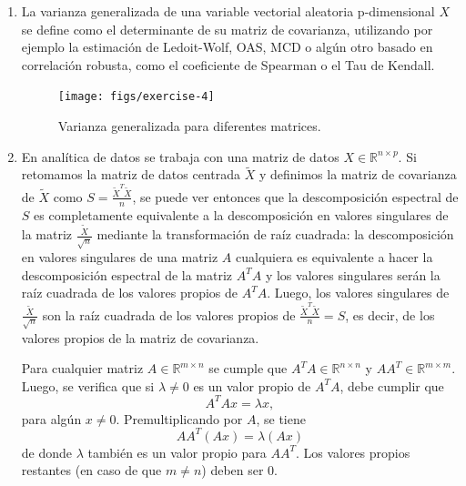 \documentclass[fleqn]{article}
\begin{document}
\begin{enumerate}
  \item La varianza generalizada de una variable vectorial aleatoria
    p-dimensional $X$ se define como el determinante de su matriz de covarianza,
    utilizando por ejemplo la estimación de Ledoit-Wolf, OAS, MCD o algún otro
    basado en correlación robusta, como el coeficiente de Spearman o el Tau de
    Kendall.
    \begin{figure}[H]
      \centering
      \texttt{[image: figs/exercise-4]}
      \caption{Varianza generalizada para diferentes matrices.}
    \end{figure}

  \item En analítica de datos se trabaja con una matriz de datos
    $X\in\mathbb{R}^{n\times p}$. Si retomamos la matriz de datos centrada
    $\tilde{X}$ y definimos la matriz de covarianza de $\tilde{X}$ como
    $S=\frac{\tilde{X}^T\tilde{X}}{n}$, se puede ver entonces que la
    descomposición espectral de $S$ es completamente equivalente a la
    descomposición en valores singulares de la matriz
    $\frac{\tilde{X}}{\sqrt{n}}$ mediante la transformación de raíz cuadrada: la
    descomposición en valores singulares de una matriz $A$ cualquiera es
    equivalente a hacer la descomposición espectral de la matriz $A^TA$ y los
    valores singulares serán la raíz cuadrada de los valores propios de $A^TA$.
    Luego, los valores singulares de $\frac{\tilde{X}}{\sqrt{n}}$ son la raíz
    cuadrada de los valores propios de $\frac{\tilde{X}^T\tilde{X}}{n}=S$, es
    decir, de los valores propios de la matriz de covarianza.

    Para cualquier matriz $A\in\mathbb{R}^{m\times n}$ se cumple que
    $A^TA\in\mathbb{R}^{n\times n}$ y $AA^T\in\mathbb{R}^{m\times m}$. Luego, se
    verifica que si $\lambda\neq0$ es un valor propio de $A^TA$, debe cumplir
    que
    \[
    A^TAx=\lambda x,
    \]
    para algún $x\neq0$. Premultiplicando por $A$, se tiene
    \[
    AA^T(Ax)=\lambda(Ax)
    \]
    de donde $\lambda$ también es un valor propio para $AA^T$. Los valores
    propios restantes (en caso de que $m\neq n$) deben ser 0.


\end{enumerate}
\end{document}
